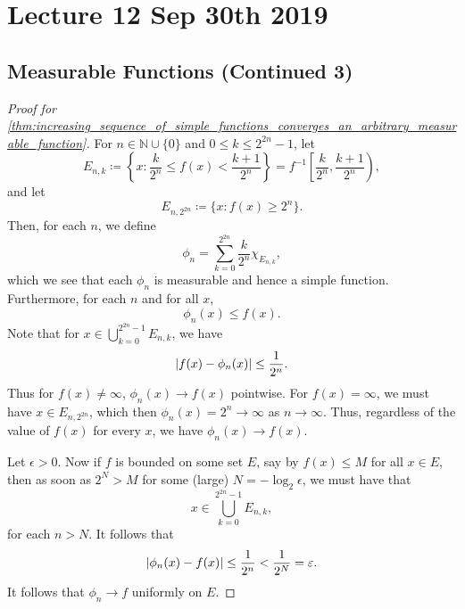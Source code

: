 \documentclass[notoc,notitlepage]{tufte-book}
\begin{document}

\chapter{Lecture 12 Sep 30th 2019}%
\label{chp:lecture_12_sep_30th_2019}

\section{Measurable Functions (Continued 3)}%
\label{sec:measurable_functions_continued_3}

\begin{proof}[Proof for \cref{thm:increasing_sequence_of_simple_functions_converges_an_arbitrary_measurable_function}]
  For $n \in \mathbb{N} \cup \{ 0 \}$ and $0 \leq k \leq 2^{2n} - 1$,
  let
  \begin{equation*}
    E_{n, k} \coloneqq \left\{ x
              : \frac{k}{2^n} \leq f(x) < \frac{k+1}{2^n} \right\}
              = f^{-1} \left[ \frac{k}{2^n}, \frac{k+1}{2^n} \right),
  \end{equation*}
  and let
  \begin{equation*}
    E_{n, 2^{2n}} \coloneqq \{ x : f(x) \geq 2^n \}.
  \end{equation*}
  Then, for each $n$, we define
  \begin{equation*}
    \phi_n = \sum_{k=0}^{2^{2n}} \frac{k}{2^n} \chi_{E_{n, k}},
  \end{equation*}
  which we see that each $\phi_n$ is measurable and hence a simple function.
  Furthermore, for each $n$ and for all $x$,
  \begin{equation*}
    \phi_n(x) \leq f(x).
  \end{equation*}
  Note that for $x \in \bigcup_{k=0}^{2^{2n} - 1} E_{n, k}$, we have
  \begin{equation*}
    \left| f(x) - \phi_n(x) \right| \leq \frac{1}{2^n}.
  \end{equation*}
  Thus for $f(x) \neq \infty$, $\phi_n(x) \to f(x)$ pointwise.
  For $f(x) = \infty$, we must have $x \in E_{n, 2^{2n}}$,
  which then $\phi_n(x) = 2^n \to \infty$ as $n \to \infty$.
  Thus, regardless of the value of $f(x)$ for every $x$,
  we have $\phi_n(x) \to f(x)$.

  Let $\epsilon > 0$.
  Now if $f$ is bounded on some set $E$, say by $f(x) \leq M$ for all $x \in E$,
  then as soon as $2^N > M$ for some (large) $N = - \log_2 \epsilon$, 
  we must have that
  \begin{equation*}
    x \in \bigcup_{k=0}^{2^{2n} - 1} E_{n, k},
  \end{equation*}
  for each $n > N$.
  It follows that
  \begin{equation*}
    \left|\phi_n(x) - f(x)\right| \leq \frac{1}{2^n} < \frac{1}{2^N} = \varepsilon.
  \end{equation*}
  It follows that $\phi_n \to f$ uniformly on $E$.
\end{proof}
\end{document}
